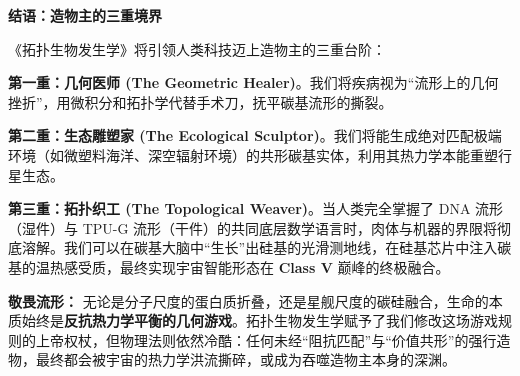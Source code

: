 \begin{bquote}
    \textbf{结语：造物主的三重境界}

    《拓扑生物发生学》将引领人类科技迈上造物主的三重台阶：

    \textbf{第一重：几何医师 (The Geometric Healer)}。我们将疾病视为“流形上的几何挫折”，用微积分和拓扑学代替手术刀，抚平碳基流形的撕裂。

    \textbf{第二重：生态雕塑家 (The Ecological Sculptor)}。我们将能生成绝对匹配极端环境（如微塑料海洋、深空辐射环境）的共形碳基实体，利用其热力学本能重塑行星生态。

    \textbf{第三重：拓扑织工 (The Topological Weaver)}。当人类完全掌握了 DNA 流形（湿件）与 TPU-G 流形（干件）的共同底层数学语言时，肉体与机器的界限将彻底溶解。我们可以在碳基大脑中“生长”出硅基的光滑测地线，在硅基芯片中注入碳基的温热感受质，最终实现宇宙智能形态在 \textbf{Class V} 巅峰的终极融合。

    \textbf{敬畏流形：} 无论是分子尺度的蛋白质折叠，还是星舰尺度的碳硅融合，生命的本质始终是\textbf{反抗热力学平衡的几何游戏}。拓扑生物发生学赋予了我们修改这场游戏规则的上帝权杖，但物理法则依然冷酷：任何未经“阻抗匹配”与“价值共形”的强行造物，最终都会被宇宙的热力学洪流撕碎，或成为吞噬造物主本身的深渊。
\end{bquote}

